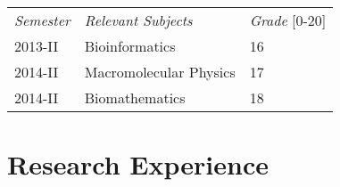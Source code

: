 \documentclass[margin,line]{res}
\begin{document}
\begin{resume}
\begin{center}
	\vspace{-9mm}
	\begin{tabular}{lll}
		\textit{Semester} & \textit{Relevant Subjects} & \textit{Grade} [0-20] \\
		2013-II & Bioinformatics & 16\\
		2014-II & Macromolecular Physics & 17\\
		2014-II & Biomathematics & 18\\
	\end{tabular}
	\vspace{1.8mm}
\end{center}


\section{\sc Research Experience}


\end{resume}
\end{document}
